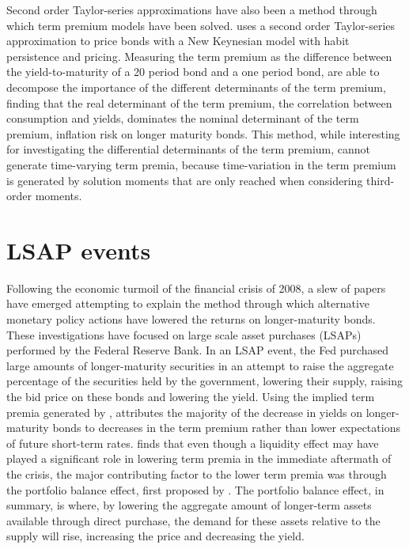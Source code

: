 \documentclass{article}
\numberwithin{equation}{section}
\begin{document}
Second order Taylor-series approximations have also been a method through which
term premium models have been solved. \citet{hoerdahletal2008} uses a second
order Taylor-series approximation to price bonds with a New Keynesian model
with habit persistence and \citet{calvo1983staggered} pricing. Measuring the
term premium as the difference between the yield-to-maturity of a 20 period
bond and a one period bond, \citet{hoerdahletal2008} are able to decompose the
importance of the different determinants of the term premium, finding that the
real determinant of the term premium, the correlation between consumption and
yields, dominates the nominal determinant of the term premium, inflation risk
on longer maturity bonds. This method, while interesting for investigating the
differential determinants of the term premium, cannot generate time-varying
term premia, because time-variation in the term premium is generated by
solution moments that are only reached when considering third-order moments.


\section{LSAP events}

Following the economic turmoil of the financial crisis of 2008, a slew of
papers have emerged attempting to explain the method through which alternative
monetary policy actions have lowered the returns on longer-maturity bonds.
These investigations have focused on large scale asset purchases (LSAPs)
performed by the Federal Reserve Bank. In an LSAP event, the Fed purchased
large amounts of longer-maturity securities in an attempt to raise the
aggregate percentage of the securities held by the government, lowering their
supply, raising the bid price on these bonds and lowering the yield. Using the
implied term premia generated by \citet{kimorphanides2005},
\citet{gagnon2010large} attributes the majority of the decrease in yields on
longer-maturity bonds to decreases in the term premium rather than lower
expectations of future short-term rates. \citet{gagnon2010large} finds that
even though a liquidity effect may have played a significant role in lowering
term premia in the immediate aftermath of the crisis, the major contributing
factor to the lower term premia was through the portfolio balance effect,
first proposed by \citet{tobin1956}. The portfolio balance effect, in summary,
is where, by lowering the aggregate amount of longer-term assets available
through direct purchase, the demand for these assets relative to the supply
will rise, increasing the price and decreasing the yield.
\end{document}

